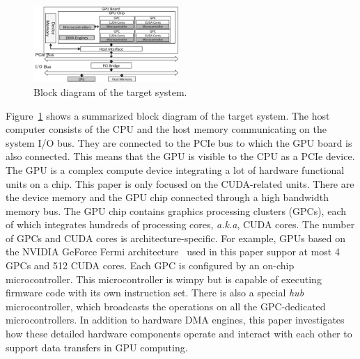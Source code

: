 \begin{figure}[!t]
 \centering
 \includegraphics[width=0.49\textwidth]{figure/Method/pci_gpu.pdf}
 \caption{Block diagram of the target system.}
 \label{fig:pci_gpu}
\end{figure}

Figure~\ref{fig:pci_gpu} shows a summarized block diagram of the target
system.
The host computer consists of the CPU and the host memory communicating
on the system I/O bus.
They are connected to the PCIe bus to which the GPU board is also
connected.
This means that the GPU is visible to the CPU as a PCIe device.
The GPU is a complex compute device integrating a lot of hardware
functional units on a chip.
This paper is only focused on the CUDA-related units.
There are the device memory and the GPU chip connected through a high
bandwidth memory bus.
The GPU chip contains graphics processing clusters (GPCs), each of which
integrates hundreds of processing cores, \textit{a.k.a}, CUDA cores.
The number of GPCs and CUDA cores is architecture-specific.
For example, GPUs based on the NVIDIA GeForce Fermi
architecture~\cite{NVIDIA_Fermi} used in this paper suppor at most 4
GPCs and 512 CUDA cores.
Each GPC is configured by an on-chip microcontroller.
This microcontroller is wimpy but is capable of executing firmware code
with its own instruction set.
There is also a special \textit{hub} microcontroller, which broadcasts the
operations on all the GPC-dedicated microcontrollers.
In addition to hardware DMA engines, this paper investigates how these
detailed hardware components operate and interact with each other to
support data transfers in GPU computing.